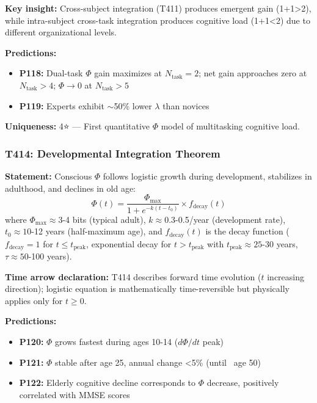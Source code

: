 \documentclass[12pt,a4paper]{article}
\begin{document}
\textbf{Key insight:} Cross-subject integration (T411) produces emergent gain (1+1>2), while intra-subject cross-task integration produces cognitive load (1+1<2) due to different organizational levels.

\textbf{Predictions:}
\begin{itemize}
\item \textbf{P118:} Dual-task $\Phi$ gain maximizes at $N_{\text{task}}=2$; net gain approaches zero at $N_{\text{task}}>4$; $\Phi \to 0$ at $N_{\text{task}}>5$
\item \textbf{P119:} Experts exhibit $\sim$50\% lower $\lambda$ than novices
\end{itemize}

\textbf{Uniqueness:} 4⭐ --- First quantitative $\Phi$ model of multitasking cognitive load.

\subsubsection{T414: Developmental Integration Theorem}

\textbf{Statement:} Conscious $\Phi$ follows logistic growth during development, stabilizes in adulthood, and declines in old age:
\begin{equation}
\Phi(t) = \frac{\Phi_{\text{max}}}{1 + e^{-k(t - t_0)}} \times f_{\text{decay}}(t)
\end{equation}
where $\Phi_{\text{max}} \approx 3$-4 bits (typical adult), $k \approx 0.3$-0.5/year (development rate), $t_0 \approx 10$-12 years (half-maximum age), and $f_{\text{decay}}(t)$ is the decay function ($f_{\text{decay}}=1$ for $t \leq t_{\text{peak}}$, exponential decay for $t > t_{\text{peak}}$ with $t_{\text{peak}} \approx 25$-30 years, $\tau \approx 50$-100 years).

\textbf{Time arrow declaration:} T414 describes forward time evolution ($t$ increasing direction); logistic equation is mathematically time-reversible but physically applies only for $t \geq 0$.

\textbf{Predictions:}
\begin{itemize}
\item \textbf{P120:} $\Phi$ grows fastest during ages 10-14 ($d\Phi/dt$ peak)
\item \textbf{P121:} $\Phi$ stable after age 25, annual change <5\% (until ~age 50)
\item \textbf{P122:} Elderly cognitive decline corresponds to $\Phi$ decrease, positively correlated with MMSE scores
\end{itemize}
\end{document}
